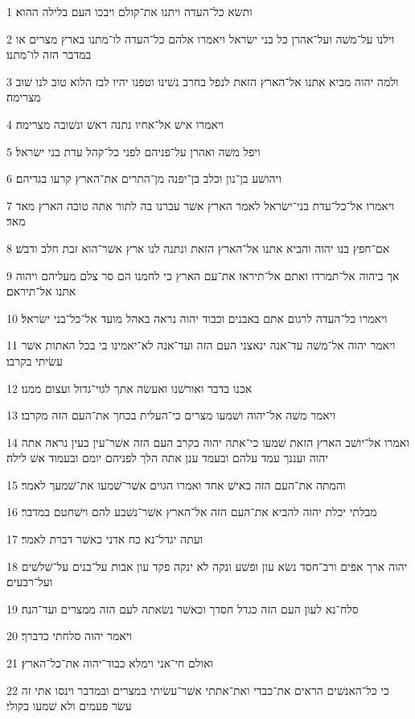 \par 1 ותשׂא כל־העדה ויתנו את־קולם ויבכו העם בלילה ההוא׃
\par 2 וילנו על־משׁה ועל־אהרן כל בני ישׂראל ויאמרו אלהם כל־העדה לו־מתנו בארץ מצרים או במדבר הזה לו־מתנו׃
\par 3 ולמה יהוה מביא אתנו אל־הארץ הזאת לנפל בחרב נשׁינו וטפנו יהיו לבז הלוא טוב לנו שׁוב מצרימה׃
\par 4 ויאמרו אישׁ אל־אחיו נתנה ראשׁ ונשׁובה מצרימה׃
\par 5 ויפל משׁה ואהרן על־פניהם לפני כל־קהל עדת בני ישׂראל׃
\par 6 ויהושׁע בן־נון וכלב בן־יפנה מן־התרים את־הארץ קרעו בגדיהם׃
\par 7 ויאמרו אל־כל־עדת בני־ישׂראל לאמר הארץ אשׁר עברנו בה לתור אתה טובה הארץ מאד מאד׃
\par 8 אם־חפץ בנו יהוה והביא אתנו אל־הארץ הזאת ונתנה לנו ארץ אשׁר־הוא זבת חלב ודבשׁ׃
\par 9 אך ביהוה אל־תמרדו ואתם אל־תיראו את־עם הארץ כי לחמנו הם סר צלם מעליהם ויהוה אתנו אל־תיראם׃
\par 10 ויאמרו כל־העדה לרגום אתם באבנים וכבוד יהוה נראה באהל מועד אל־כל־בני ישׂראל׃
\par 11 ויאמר יהוה אל־משׁה עד־אנה ינאצני העם הזה ועד־אנה לא־יאמינו בי בכל האתות אשׁר עשׂיתי בקרבו׃
\par 12 אכנו בדבר ואורשׁנו ואעשׂה אתך לגוי־גדול ועצום ממנו׃
\par 13 ויאמר משׁה אל־יהוה ושׁמעו מצרים כי־העלית בכחך את־העם הזה מקרבו׃
\par 14 ואמרו אל־יושׁב הארץ הזאת שׁמעו כי־אתה יהוה בקרב העם הזה אשׁר־עין בעין נראה אתה יהוה ועננך עמד עלהם ובעמד ענן אתה הלך לפניהם יומם ובעמוד אשׁ לילה׃
\par 15 והמתה את־העם הזה כאישׁ אחד ואמרו הגוים אשׁר־שׁמעו את־שׁמעך לאמר׃
\par 16 מבלתי יכלת יהוה להביא את־העם הזה אל־הארץ אשׁר־נשׁבע להם וישׁחטם במדבר׃
\par 17 ועתה יגדל־נא כח אדני כאשׁר דברת לאמר׃
\par 18 יהוה ארך אפים ורב־חסד נשׂא עון ופשׁע ונקה לא ינקה פקד עון אבות על־בנים על־שׁלשׁים ועל־רבעים׃
\par 19 סלח־נא לעון העם הזה כגדל חסדך וכאשׁר נשׂאתה לעם הזה ממצרים ועד־הנה׃
\par 20 ויאמר יהוה סלחתי כדברך׃
\par 21 ואולם חי־אני וימלא כבוד־יהוה את־כל־הארץ׃
\par 22 כי כל־האנשׁים הראים את־כבדי ואת־אתתי אשׁר־עשׂיתי במצרים ובמדבר וינסו אתי זה עשׂר פעמים ולא שׁמעו בקולי׃
